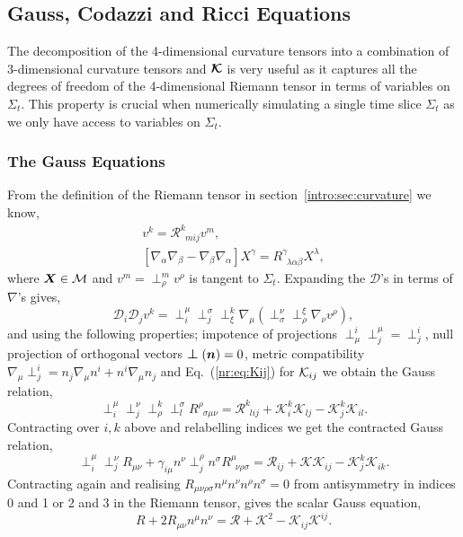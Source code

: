 \subsection{Gauss, Codazzi and Ricci Equations}\label{nr:sec:gausscodazzi}
The decomposition of the 4-dimensional curvature tensors into a combination of 3-dimensional curvature tensors and $\boldsymbol{\mathcal{K}}$ is very useful as it captures all the degrees of freedom of the 4-dimensional Riemann tensor in terms of variables on $\Sigma_t$. This property is crucial when numerically simulating a single time slice $\Sigma_t$ as we only have access to variables on $\Sigma_t$.

\subsubsection{The Gauss Equations}
From the definition of the Riemann tensor in section~\ref{intro:sec:curvature} we know,
\begin{align}
[\mathcal{D}_ i \mathcal{D}_ j -\mathcal{D}_ j \mathcal{D}_ i ]v^ k  = \mathcal{R}^ k _{\,\,\, m  i  j }v^ m  , \\
 [\nabla_\alpha\nabla_\beta-\nabla_\beta\nabla_\alpha]X^\gamma = {R}^\gamma_{\,\,\,\lambda \alpha\beta}X^\lambda  ,
 \end{align}
where $\boldsymbol{X}\in \mathcal{M}$ and $v^ m = \perp^ m  _\rho v^\rho$ is tangent to $\Sigma_t$. Expanding the $\mathcal{D}$'s in terms of $\nabla$'s gives,
\begin{equation} \mathcal{D}_ i  \mathcal{D}_ j  v^ k  = \perp^\mu_ i  \perp_ j ^\sigma \perp^ k _\xi \nabla_\mu(\perp^\nu_\sigma \perp^\xi_\rho \nabla_\nu v^\rho),\end{equation}
and using the following properties; impotence of projections $\perp^ i _\mu \perp^\mu_ j  = \perp^ i _ j $, null projection of orthogonal vectors $\boldsymbol{\perp} (\boldsymbol{n}) =0$, metric compatibility $\nabla_\mu \perp^ i _ j  = n_ j \nabla_\mu n^ i  + n^ i  \nabla_\mu n_ j $ and Eq.~(\ref{nr:eq:Kij}) for $\mathcal{K}_{ij}$ we obtain the Gauss relation,
\begin{equation} \perp^\mu_ i  \perp^\nu_ j  \perp^ k _\rho \perp^\sigma_ l R^{\rho}_{\,\,\,\sigma\mu\nu} = \mathcal{R}^ k _{\,\,\, l i  j } + \mathcal{K}^ k _ i  \mathcal{K}_{ l j } - \mathcal{K}^ k _ j  \mathcal{K}_{ i l} . \end{equation}
Contracting over $ i , k $ above and relabelling indices we get the contracted Gauss relation,
\begin{equation} \perp^\mu_ i  \perp^\nu_ j  R_{\mu\nu} +  \gamma _{ i \mu}n^\nu\perp^\rho_ j  n^\sigma R^\mu_{\,\,\,\nu\rho\sigma} = \mathcal{R}_{ i  j } + \mathcal{K} \mathcal{K}_{ i  j } - \mathcal{K}^k_ j  \mathcal{K}_{ i k}.  \end{equation}
Contracting again and realising $R_{\mu\nu\rho\sigma}n^\mu n^\nu n^\rho n^\sigma=0$ from antisymmetry in indices 0 and 1 or 2 and 3 in the Riemann tensor, gives the scalar Gauss equation,
\begin{equation}R + 2R_{\mu\nu}n^\mu n^\nu = \mathcal{R} + \mathcal{K}^2 - \mathcal{K}_{ij}\mathcal{K}^{ij}.\end{equation}

